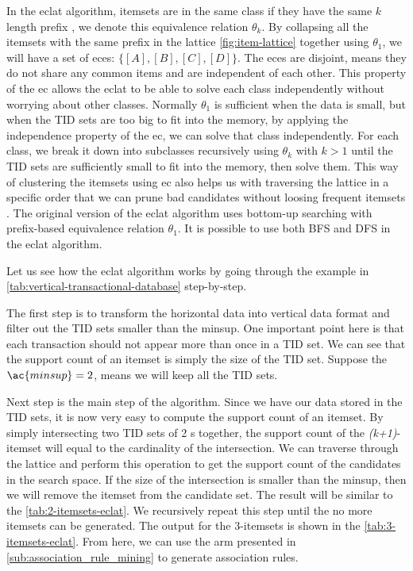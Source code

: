 
In the \ac{eclat} algorithm, itemsets are in the same class if they have the same $k$ length prefix \citep{zaki2000}, we denote this equivalence relation $\theta_k$.
By collapsing all the itemsets with the same prefix in the lattice \autoref{fig:item-lattice} together using $\theta_1$, we will have a set of \ac{ec}es: $\{[A], [B], [C], [D]\}$.
The \ac{ec}es are disjoint, means they do not share any common items and are independent of each other. %
This property of the \ac{ec} allows the \ac{eclat} to be able to solve each class independently without worrying about other classes.
Normally $\theta_1$ is sufficient when the data is small, but when the TID sets are too big to fit into the memory, by applying the independence property of the \ac{ec}, we can solve that class independently.
For each class, we break it down into subclasses recursively using $\theta_k$ with $k>1$ until the TID sets are sufficiently small to fit into the memory, then solve them.
This way of clustering the itemsets using \ac{ec} also helps us with traversing the lattice in a specific order that we can prune bad candidates without loosing frequent itemsets \citep{zaki2000}.
The original version of the \ac{eclat} algorithm uses bottom-up searching with prefix-based equivalence relation $\theta_1$.
It is possible to use both \ac{BFS} and \ac{DFS} in the \ac{eclat} algorithm.

Let us see how the \ac{eclat} algorithm works by going through the example in \autoref{tab:vertical-transactional-database} step-by-step.

The first step is to transform the horizontal data into vertical data format and filter out the \ac{TID} sets smaller than the \ac{minsup}.
One important point here is that each transaction should not appear more than once in a \ac{TID} set.
We can see that the support count of an itemset is simply the size of the \ac{TID} set.
Suppose the $\ac{minsup}=2$, means we will keep all the \ac{TID} sets.

Next step is the main step of the algorithm.
Since we have our data stored in the \ac{TID} sets, it is now very easy to compute the support count of an itemset.
By simply intersecting two \ac{TID} sets of 2 \kItemset s together, the support count of the \textit{(k+1)}-itemset will equal to the cardinality of the intersection.
We can traverse through the lattice and perform this operation to get the support count of the candidates in the search space.
If the size of the intersection is smaller than the \ac{minsup}, then we will remove the itemset from the candidate set.
The result will be similar to the \autoref{tab:2-itemsets-eclat}.
We recursively repeat this step until the no more itemsets can be generated.
The output for the 3-itemsets is shown in the \autoref{tab:3-itemsets-eclat}.
From here, we can use the \ac{arm} presented in \autoref{sub:association_rule_mining} to generate association rules.

